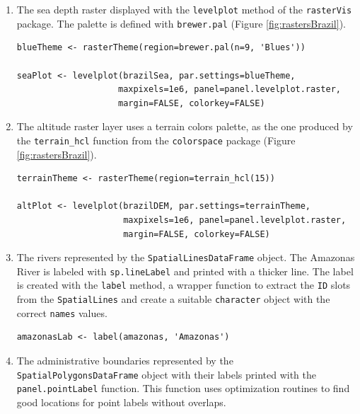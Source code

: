 \documentclass[smallroyalvopaper]{memoir}
\begin{document}
\begin{enumerate}
\item The sea depth raster displayed with the \texttt{levelplot} method of the
\texttt{rasterVis} package. The palette is defined with \texttt{brewer.pal}
(Figure \ref{fig:rastersBrazil}).
\lstset{language=R,numbers=none}
\begin{lstlisting}
blueTheme <- rasterTheme(region=brewer.pal(n=9, 'Blues'))

seaPlot <- levelplot(brazilSea, par.settings=blueTheme,
                    maxpixels=1e6, panel=panel.levelplot.raster,
                    margin=FALSE, colorkey=FALSE)
\end{lstlisting}


\item The altitude raster layer uses a terrain colors palette, as the one
produced by the \texttt{terrain\_hcl} function from the \texttt{colorspace} package
\cite{Ihaka.Murrell.ea2011} (Figure \ref{fig:rastersBrazil}).
\lstset{language=R,numbers=none}
\begin{lstlisting}
terrainTheme <- rasterTheme(region=terrain_hcl(15))

altPlot <- levelplot(brazilDEM, par.settings=terrainTheme,
                     maxpixels=1e6, panel=panel.levelplot.raster,
                     margin=FALSE, colorkey=FALSE)
\end{lstlisting}


\item The rivers represented by the \texttt{SpatialLinesDataFrame} object. The
Amazonas River is labeled with \texttt{sp.lineLabel} and printed with a
thicker line. The label is created with the \texttt{label} method, a
wrapper function to extract the \texttt{ID} slots from the \texttt{SpatialLines}
and create a suitable \texttt{character} object with the correct \texttt{names}
values.

\lstset{language=R,numbers=none}
\begin{lstlisting}
amazonasLab <- label(amazonas, 'Amazonas')
\end{lstlisting}

\item The administrative boundaries represented by the
\texttt{SpatialPolygonsDataFrame} object with their labels printed with
the \texttt{panel.pointLabel} function. This function uses optimization
routines to find good locations for point labels without overlaps.


\end{enumerate}
\end{document}
